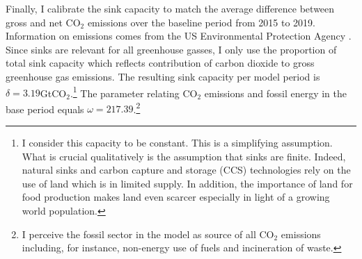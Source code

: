 Finally, I calibrate the sink capacity to match the average difference between gross and net CO$_2$ emissions over the baseline period from 2015 to 2019. Information on emissions comes from the US Environmental Protection Agency \citep{EPAems}. Since sinks are relevant for all greenhouse gasses, I only use the proportion of total sink capacity which reflects contribution of carbon dioxide to gross greenhouse gas emissions. The resulting sink capacity per model period is $\delta=3.19$GtCO$_2$.\footnote{ I consider this capacity to be constant. This is a simplifying assumption. What is crucial qualitatively is the assumption that sinks are finite. Indeed, natural sinks and carbon capture and storage (CCS) technologies rely on the use of land \citep{VanVuuren2018AlternativeTechnologies} which is in limited supply. In addition, the importance of land for food production makes land even scarcer especially in light of a growing world population.}
The parameter relating CO$_2$ emissions and fossil energy in the base period equals $\omega=217.39$.\footnote{  I perceive the fossil sector in the model as source of all CO$_2$ emissions including, for instance, non-energy use of fuels and incineration of waste.}  


